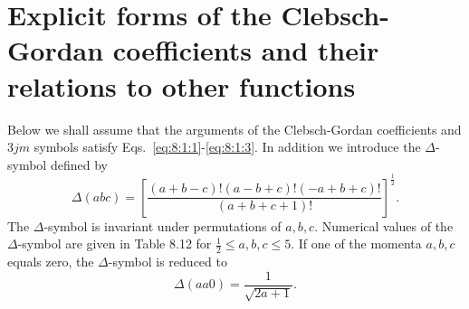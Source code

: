 \section[explicit form of CG coefficients]{Explicit forms of the Clebsch-Gordan coefficients and their relations to other functions}\label{sec:8.2}
Below we shall assume that the arguments of the Clebsch-Gordan coefficients and $3 j m$ symbols satisfy Eqs.~\ref{eq:8:1:1}-\ref{eq:8:1:3}. In addition we introduce the $\Delta$-symbol defined by
\begin{equation}
\Delta(a b c)=\left[\frac{(a+b-c)!(a-b+c)!(-a+b+c)!}{(a+b+c+1)!}\right]^{\frac{1}{2}}. \label{eq:8:2:1}
\end{equation}
The $\Delta$-symbol is invariant under permutations of $a, b, c$. Numerical values of the $\Delta$-symbol are given in Table 8.12 for $\frac{1}{2} \leq a, b, c \leq 5$. If one of the momenta $a, b, c$ equals zero, the $\Delta$-symbol is reduced to
\begin{equation}
\Delta(a a 0)=\frac{1}{\sqrt{2 a+1}}. \label{eq:8:2:2}
\end{equation}
